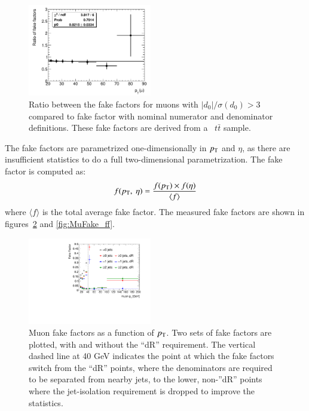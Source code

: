 \begin{figure}[h]
\centering \includegraphics[width=0.48\textwidth]{figures/backgrounds/MuFake_extrap_ratio}
\caption{\label{fig:MuFake_extrap}Ratio between the fake factors for muons with $|d_0|/\sigma(d_0)>3$ compared to fake factor with nominal numerator and denominator definitions.  These fake factors are derived from a \powheg\ $t\bar{t}$ sample.}
\end{figure}

The fake factors are parametrized one-dimensionally in $p_{\text{T}}$ and $\eta$, as there are insufficient statistics to do a full two-dimensional parametrization. The fake factor is computed as:
\begin{equation}
f(\pt,\ \eta) = \frac{f(\pt)\times f(\eta)}{\langle f \rangle}
\end{equation}
where $\langle f \rangle$ is the total average fake factor. The measured fake factors are shown in figures~\ref{fig:MuFake_ff_1D} and \ref{fig:MuFake_ff}. 

\begin{figure}
\centering \includegraphics[width=0.48\textwidth]{figures/backgrounds/all_1D_pt}
\caption{\label{fig:MuFake_ff_1D}Muon fake factors as a function of $p_{\text{T}}$. Two sets of fake factors are plotted, with and without the ``dR'' requirement. The vertical dashed line at 40 GeV indicates the point at which the fake factors switch from the ``dR'' points, where the denominators are required to be separated from nearby jets, to the lower, non-''dR'' points where the jet-isolation requirement is dropped to improve the statistics.}
\end{figure}

